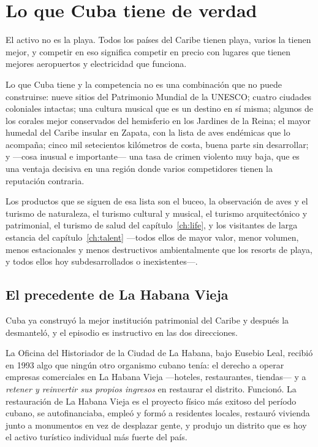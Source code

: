\section{Lo que Cuba tiene de verdad}

El activo no es la playa. Todos los países del Caribe tienen playa, varios la tienen mejor,
y competir en eso significa competir en precio con lugares que tienen mejores aeropuertos y
electricidad que funciona.

Lo que Cuba tiene y la competencia no es una combinación que no puede construirse: nueve
sitios del Patrimonio Mundial de la UNESCO; cuatro ciudades coloniales intactas; una
cultura musical que es un destino en sí misma; algunos de los corales mejor conservados del
hemisferio en los Jardines de la Reina; el mayor humedal del Caribe insular en Zapata, con
la lista de aves endémicas que lo acompaña; cinco mil setecientos kilómetros de costa,
buena parte sin desarrollar; y ---cosa inusual e importante--- una tasa de crimen violento
muy baja, que es una ventaja decisiva en una región donde varios competidores tienen la
reputación contraria.

Los productos que se siguen de esa lista son el buceo, la observación de aves y el turismo
de naturaleza, el turismo cultural y musical, el turismo arquitectónico y patrimonial, el
turismo de salud del capítulo~\ref{ch:life}, y los visitantes de larga estancia del
capítulo~\ref{ch:talent} ---todos ellos de mayor valor, menor volumen, menos estacionales y
menos destructivos ambientalmente que los resorts de playa, y todos ellos hoy
subdesarrollados o inexistentes---.

\subsection{El precedente de La Habana Vieja}

Cuba ya construyó la mejor institución patrimonial del Caribe y después la desmanteló, y
el episodio es instructivo en las dos direcciones.

La Oficina del Historiador de la Ciudad de La Habana, bajo Eusebio Leal, recibió en 1993
algo que ningún otro organismo cubano tenía: el derecho a operar empresas comerciales en
La Habana Vieja ---hoteles, restaurantes, tiendas--- y a \emph{retener y reinvertir sus
propios ingresos} en restaurar el distrito. Funcionó. La restauración de La Habana Vieja es
el proyecto físico más exitoso del período cubano, se autofinanciaba, empleó y formó a
residentes locales, restauró vivienda junto a monumentos en vez de desplazar gente, y
produjo un distrito que es hoy el activo turístico individual más fuerte del país.

